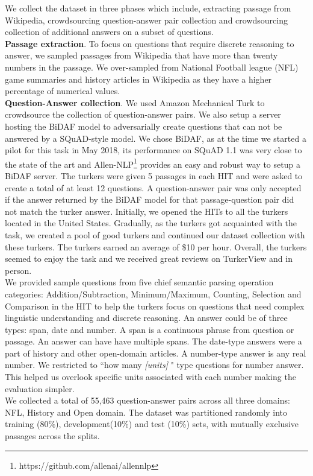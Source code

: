 
We collect the dataset in three phases which include, extracting passage from Wikipedia, crowdsourcing question-answer pair collection and crowdsourcing collection of additional answers on a subset of questions. 
\\
\textbf{Passage extraction}. To focus on questions that require discrete reasoning to answer, we sampled passages from Wikipedia that have more than twenty numbers in the passage. We over-sampled from National Football league (NFL) game summaries and history articles in Wikipedia as they have a higher percentage of numerical values.
\\
\textbf{Question-Answer collection}. We used Amazon Mechanical Turk to crowdsource the collection of question-answer pairs. We also setup a server hosting the BiDAF model to adversarially create questions that can not be answered by a SQuAD-style model. We chose BiDAF, as at the time we started a pilot for this task in May 2018, its performance on SQuAD 1.1 was very close to the state of the art and Allen-NLP\footnote{https://github.com/allenai/allennlp} provides an easy and robust way to setup a BiDAF server. The turkers were given 5 passages in each HIT and were asked to create a total of at least 12 questions. A question-answer pair was only accepted if the answer returned by the BiDAF model for that passage-question pair did not match the turker answer. Initially, we opened the HITs to all the turkers located in the United States. Gradually, as the turkers got acquainted with the task, we created a pool of good turkers and continued our dataset collection with these turkers. The turkers earned an average of \$10 per hour. Overall, the turkers seemed to enjoy the task and we received great reviews on TurkerView and in person.
\\
We provided sample questions from five chief semantic parsing operation categories: Addition/Subtraction, Minimum/Maximum, Counting, Selection and Comparison in the HIT to help the turkers focus on questions that need complex linguistic understanding and discrete reasoning. An answer could be of three types: span, date and number. A span is a continuous phrase from question or passage. An answer can have have multiple spans. The date-type answers were a part of history and other open-domain articles. A number-type answer is any real number. We restricted to ``how many \textit{[units]} " type questions for number answer. This helped us overlook specific units associated with each number making the evaluation simpler.
\\
We collected a total of 55,463 question-answer pairs across all three domains: NFL, History and Open domain. The dataset was partitioned randomly into training (80\%), development(10\%) and test (10\%) sets, with mutually exclusive passages across the splits.


